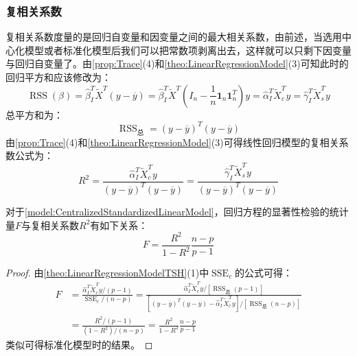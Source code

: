 \subsubsection{复相关系数}
\begin{note}
	复相关系数度量的是回归自变量和因变量之间的最大相关系数，由前述，当选用中心化模型或者标准化模型后我们可以把常数项剥离出去，这样就可以只剩下因变量与回归自变量了。由\cref{prop:Trace}(4)和\cref{theo:LinearRegressionModel}(3)可知此时的回归平方和应该修改为：
	\begin{equation*}
		\operatorname{RSS}(\beta)=\hat{\beta}_I^T\tilde{X}^T(y-\overline{y})=\hat{\beta}_I^T\tilde{X}^T\left(I_n-\frac{1}{n}\mathbf{1}_n\mathbf{1}_n^T\right)y=\hat{\alpha}_I^T\tilde{X}_c^Ty=\hat{\gamma}_I^T\tilde{X}_s^Ty
	\end{equation*}
	总平方和为：
	\begin{equation*}
		\operatorname{RSS}_{\text{总}}=(y-\overline{y})^T(y-\overline{y})
	\end{equation*}
	由\cref{prop:Trace}(4)和\cref{theo:LinearRegressionModel}(3)可得线性回归模型的复相关系数公式为：
	\begin{equation*}
		R^2=\frac{\hat{\alpha}_I^T\tilde{X}_c^Ty}{(y-\overline{y})^T(y-\overline{y})}=\frac{\hat{\gamma}_I^T\tilde{X}_s^Ty}{(y-\overline{y})^T(y-\overline{y})}
	\end{equation*}
\end{note}
\begin{theorem}\label{theo:LinearRegressionModelFR2}
	对于\cref{model:CentralizedStandardizedLinearModel}，回归方程的显著性检验的统计量$F$与复相关系数$R^2$有如下关系：
	\begin{equation*}
		F=\frac{R^2}{1-R^2}\frac{n-p}{p-1}
	\end{equation*}
\end{theorem}
\begin{proof}
	由\cref{theo:LinearRegressionModelTSH}(1)中$\operatorname{SSE}_c$的公式可得：
	\begin{align*}
		F&=\frac{\hat{\alpha}_I^T\tilde{X}_c^Ty/(p-1)}{\operatorname{SSE}_c/(n-p)}=\frac{\hat{\alpha}_I^T\tilde{X}_c^Ty/[\operatorname{RSS}_{\text{总}}(p-1)]}{[(y-\overline{y})^T(y-\overline{y})-\hat{\alpha}_I^T\tilde{X}_c^Ty]/[\operatorname{RSS}_{\text{总}}(n-p)]} \\
		&=\frac{R^2/(p-1)}{(1-R^2)/(n-p)}=\frac{R^2}{1-R^2}\frac{n-p}{p-1}
	\end{align*}
	类似可得标准化模型时的结果。
\end{proof}

